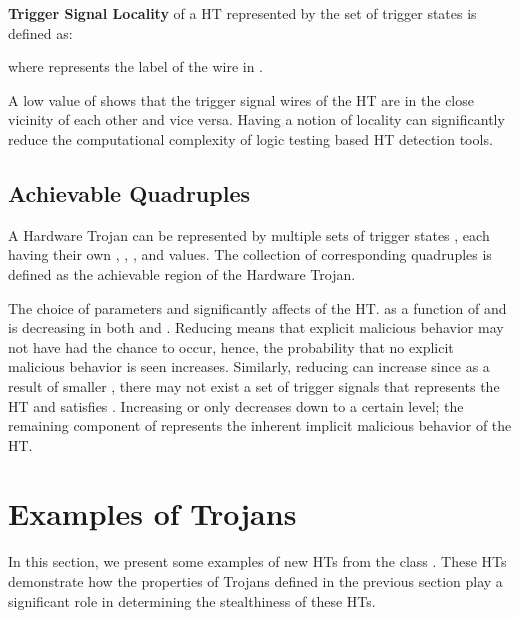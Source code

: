\documentclass[10pt,journal,compsoc]{IEEEtran}
\begin{document}
\begin{definition} \label{def:locality}
\textbf{Trigger Signal Locality \boldmath{}} of a HT represented by the set of trigger states  is defined as: 

where  represents the label of the  wire in .
\end{definition}

A low value of  shows that the trigger signal wires of the HT are in the close vicinity of each other and vice versa.
Having a notion of locality can significantly reduce the computational complexity of logic testing based HT detection tools. 

\subsection{Achievable Quadruples }
A Hardware Trojan can be represented by multiple sets of trigger states , each having their own , , , and  values.  
The collection of corresponding quadruples  is defined as the achievable region of the Hardware Trojan.




The choice of parameters  and  significantly affects  of the HT.  as a function of  and  is decreasing in both  and .
Reducing  means that explicit malicious behavior may not have had the chance to occur, hence, the probability   that no explicit malicious behavior is seen increases. 
Similarly, reducing  can increase  since as a result of smaller , there may not exist a set of trigger signals  that represents the HT and satisfies .
Increasing  or  only decreases  down to a certain level; the remaining component of  represents the inherent implicit malicious behavior of the HT.






\section{Examples of  Trojans}
In this section, we present some examples of new HTs from the class .
These HTs demonstrate how the properties of  Trojans defined in the previous section play a significant role in determining the stealthiness of these HTs.
\end{document}
